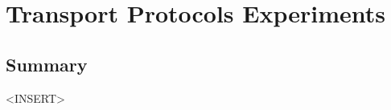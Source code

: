 \section{Transport Protocols Experiments}

\clearpage


\clearpage


\clearpage


\clearpage


\clearpage

\subsection{Summary}

<INSERT>
